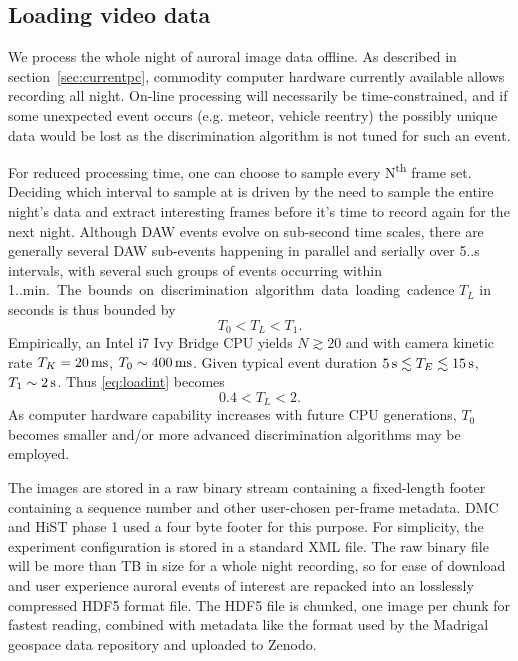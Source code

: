 \FloatBarrier
\subsection{Loading video data}\label{sec:load}
We process the whole night of auroral image data offline.
As described in section~\ref{sec:currentpc}, commodity computer hardware currently available allows recording all night.
On-line processing will necessarily be time-constrained, and if some unexpected event occurs (e.g. meteor, vehicle reentry) the possibly unique data would be lost as the discrimination algorithm is not tuned for such an event.

For reduced processing time, one can choose to sample every N\textsuperscript{th} frame set.
Deciding which interval to sample at is driven by the need to sample the entire night's data and extract interesting frames before it's time to record again for the next night.
Although DAW events evolve on sub-second time scales, there are generally several DAW sub-events happening in parallel and serially over 5..\unit[15]{s} intervals, with several such groups of events occurring within 1..\unit[5]{min.}
The bounds on discrimination algorithm data loading cadence $T_L$ in seconds is thus bounded by
\begin{equation}\label{eq:loadint}
T_0 < T_L < T_1.
\end{equation}
Empirically, an Intel i7 Ivy Bridge CPU yields $N \gtrsim 20$ and with camera kinetic rate $T_K=\unit[20]{ms}$, $T_0 \sim \unit[400]{ms}$.
Given typical event duration $\unit[5]{s} \lesssim T_E \lesssim \unit[15]{s}$, $T_1 \sim \unit[2]{s}$.
Thus \eqref{eq:loadint} becomes
\begin{equation}\label{eq:actload}
0.4 < T_L < 2.
\end{equation}
As computer hardware capability increases with future CPU generations, $T_0$ becomes smaller and/or more advanced discrimination algorithms may be employed.

The images are stored in a raw binary stream containing a fixed-length footer containing a sequence number and other user-chosen per-frame metadata.
DMC and HiST phase 1 used a four byte footer for this purpose.
For simplicity, the experiment configuration is stored in a standard XML file.
The raw binary file will be more than \unit[1]{TB} in size for a whole night recording, so for ease of download and user experience auroral events of interest are repacked into an losslessly compressed HDF5 format file.
The HDF5 file is chunked, one image per chunk for fastest reading, combined with metadata like the format used by the Madrigal geospace data repository \citep{madrigal} and uploaded to Zenodo.

